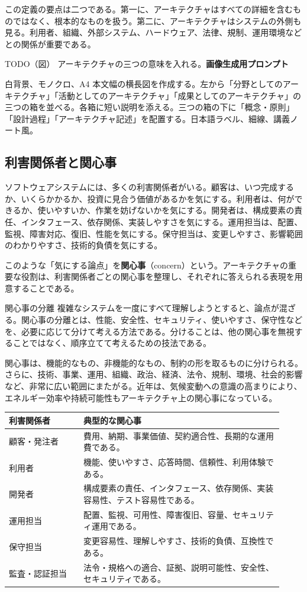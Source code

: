 \documentclass[a4paper,11pt]{ltjsarticle}
\newcommand{\todofig}[2]{\begin{statementbox}{TODO（図） #1}\textbf{画像生成用プロンプト}\par #2\end{statementbox}}
\newcommand{\keyterm}[1]{\textbf{#1}}
\newcommand{\en}[1]{（#1）}
\begin{document}
この定義の要点は二つである。第一に、アーキテクチャはすべての詳細を含むものではなく、根本的なものを扱う。第二に、アーキテクチャはシステムの外側も見る。利用者、組織、外部システム、ハードウェア、法律、規制、運用環境などとの関係が重要である。

\todofig{アーキテクチャの三つの意味を入れる。}{白背景、モノクロ、A4 本文幅の横長図を作成する。左から「分野としてのアーキテクチャ」「活動としてのアーキテクチャ」「成果としてのアーキテクチャ」の三つの箱を並べる。各箱に短い説明を添える。三つの箱の下に「概念・原則」「設計過程」「アーキテクチャ記述」を配置する。日本語ラベル、細線、講義ノート風。}

\subsection{利害関係者と関心事}
ソフトウェアシステムには、多くの利害関係者がいる。顧客は、いつ完成するか、いくらかかるか、投資に見合う価値があるかを気にする。利用者は、何ができるか、使いやすいか、作業を妨げないかを気にする。開発者は、構成要素の責任、インタフェース、依存関係、実装しやすさを気にする。運用担当は、配置、監視、障害対応、復旧、性能を気にする。保守担当は、変更しやすさ、影響範囲のわかりやすさ、技術的負債を気にする。

このような「気にする論点」を\keyterm{関心事}\en{concern}という。アーキテクチャの重要な役割は、利害関係者ごとの関心事を整理し、それぞれに答えられる表現を用意することである。

\begin{statementbox}{関心事の分離}
複雑なシステムを一度にすべて理解しようとすると、論点が混ざる。関心事の分離とは、性能、安全性、セキュリティ、使いやすさ、保守性などを、必要に応じて分けて考える方法である。分けることは、他の関心事を無視することではなく、順序立てて考えるための技法である。
\end{statementbox}

関心事は、機能的なもの、非機能的なもの、制約の形を取るものに分けられる。さらに、技術、事業、運用、組織、政治、経済、法令、規制、環境、社会的影響など、非常に広い範囲にまたがる。近年は、気候変動への意識の高まりにより、エネルギー効率や持続可能性もアーキテクチャ上の関心事になっている。

\begin{longtable}{P{0.25\linewidth}P{0.67\linewidth}}
\toprule
利害関係者 & 典型的な関心事 \\
\midrule
顧客・発注者 & 費用、納期、事業価値、契約適合性、長期的な運用費である。 \\
利用者 & 機能、使いやすさ、応答時間、信頼性、利用体験である。 \\
開発者 & 構成要素の責任、インタフェース、依存関係、実装容易性、テスト容易性である。 \\
運用担当 & 配置、監視、可用性、障害復旧、容量、セキュリティ運用である。 \\
保守担当 & 変更容易性、理解しやすさ、技術的負債、互換性である。 \\
監査・認証担当 & 法令・規格への適合、証拠、説明可能性、安全性、セキュリティである。 \\
\bottomrule
\end{longtable}
\end{document}
